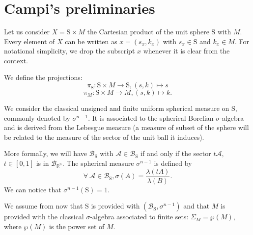 \documentclass[letterpaper, 10 pt, conference]{ieeeconf}  %
\newcommand{\calA}{\mathcal{A}}
\newcommand{\sphere}{\text{S}}
\begin{document}
\section{Campi's preliminaries}

 Let us consider $X = \sphere \times M$ the Cartesian product of the unit sphere $\sphere$ with $M$. Every element of $X$ can be written as $x = (s_x, k_x)$ with $s_x \in \sphere$ and $k_x \in M$. For notational simplicity, we drop the subscript $x$ whenever it is clear from the context.

We define the projections:
$$\pi_{\sphere}: \sphere \times M \rightarrow \sphere, (s,k) \mapsto s$$
$$\pi_M: \sphere \times M \rightarrow M, (s,k) \mapsto k.$$


We consider the classical unsigned and finite uniform spherical measure on $\sphere$, commonly denoted by $\sigma^{n-1}$. It is associated to the spherical Borelian $\sigma$-algebra and is derived from the Lebesgue measure (a measure of subset of the sphere will be related to the measure of the sector of the unit ball it induces).

More formally, we will have $\mathcal{B}_{\sphere}$ with $\calA \in \mathcal{B}_{\sphere}$ if and only if the sector $t \calA$, $t \in [0,1]$ is in $\mathcal{B}_{\mathbb{R}^n}$. The spherical measure $\sigma^{n-1}$ is defined by
$$\forall\ \calA \in \mathcal{B}_{\sphere}, \sigma(A) = \frac{\lambda(tA)}{\lambda(B)}. $$
We can notice that $\sigma^{n-1}(\sphere) = 1$.

We assume from now that $\sphere$ is provided with $(\mathcal{B}_{\sphere},\sigma^{n-1})$ and that $M$ is provided with the classical $\sigma$-algebra associated to finite sets: $\Sigma_M = \wp(M)$, where $\wp(M)$ is the power set of $M$.
\end{document}
